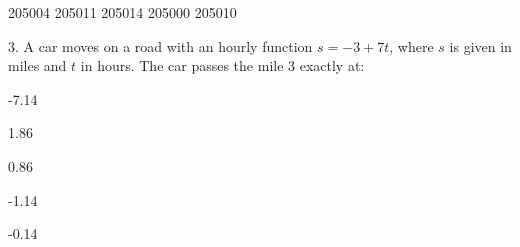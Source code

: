 \documentclass[10pt,brazil,a4paper]{exam}
\begin{document}
\vspace{0mm}

\begin{oneparchoices}
\choice {}\hspace{2.0mm}205004
\choice {}\hspace{2.0mm}205011
\choice {}\hspace{2.0mm}205014
\choice {}\hspace{2.0mm}205000
\choice {}205010

\end{oneparchoices}\vspace{1mm}



 \hspace{0mm} 3. A car moves on a road with an hourly function
$s=-3 + 7t$, where $s$ is
given in miles and $t$ in hours. The car passes
the mile 3 exactly at:

\vspace{0mm}

\begin{oneparchoices}
\choice {}\hspace{2.0mm}-7.14

\choice {}\hspace{2.0mm}1.86

\choice {}0.86

\choice {}\hspace{2.0mm}-1.14

\choice {}\hspace{2.0mm}-0.14

\end{oneparchoices}\vspace{1mm}








 \ \ \ 
 \newpage
\end{document}
